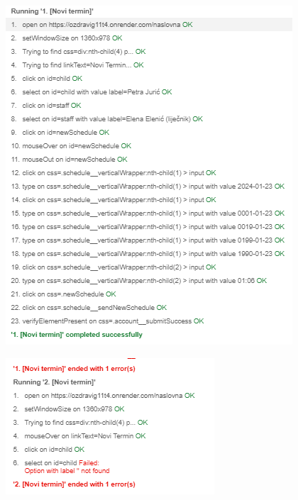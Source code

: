 \begin{figure}[H]
	\includegraphics[scale=0.6]{dijagrami/test31.PNG}
	\centering
	\label{fig:myChart}
\end{figure}

\begin{figure}[H]
	\includegraphics[scale=0.6]{dijagrami/test32.PNG}
	\centering
	\label{fig:myChart}
\end{figure}

